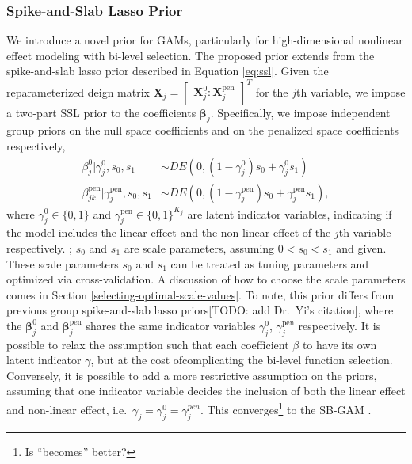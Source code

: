 \documentclass[AMA,STIX1COL,]{WileyNJD-v2}
\begin{document}
\hypertarget{spike-and-slab-lasso-prior}{%
\subsubsection{Spike-and-Slab Lasso
Prior}\label{spike-and-slab-lasso-prior}}

We introduce a novel prior for GAMs, particularly for high-dimensional
nonlinear effect modeling with bi-level selection. The proposed prior
extends from the spike-and-slab lasso prior described in Equation
\ref{eq:ssl}. Given the reparameterized deign matrix
\(\boldsymbol{X}_j = \begin{bmatrix} \boldsymbol{X}_j^0 : \boldsymbol{X}_j^\text{pen}\end{bmatrix}^T\)
for the \(j\)th variable, we impose a two-part SSL prior to the
coefficients \(\boldsymbol{\beta}_j\). Specifically, we impose
independent group priors on the null space coefficients and on the
penalized space coefficients respectively, \[
\begin{aligned}
  \beta^0_{j} |\gamma^0_{j},s_0,s_1 &\sim DE(0,(1-\gamma^0_{j}) s_0 + \gamma^0_{j} s_1)\\
  \beta^\text{pen}_{jk} | \gamma^\text{pen}_{j},s_0,s_1 &\sim DE(0,(1-\gamma^\text{pen}_{j}) s_0 + \gamma^\text{pen}_{j} s_1), 
\end{aligned}
\] where \(\gamma^0_{j}\in\{0,1\}\) and
\(\gamma^\text{pen}_{j}\in \{0,1\}^{K_j}\) are latent indicator
variables, indicating if the model includes the linear effect and the
non-linear effect of the \(j\)th variable respectively. ; \(s_0\) and
\(s_1\) are scale parameters, assuming \(0 < s_0 < s_1\) and given.
These scale parameters \(s_0\) and \(s_1\) can be treated as tuning
parameters and optimized via cross-validation. A discussion of how to
choose the scale parameters comes in Section
\ref{selecting-optimal-scale-values}. To note, this prior differs from
previous group spike-and-slab lasso priors{[}TODO: add Dr.~Yi's
citation{]}, where the \(\boldsymbol{\beta}^0_j\) and
\(\boldsymbol{\beta}^\text{pen}_j\) shares the same indicator variables
\(\gamma_j^0\), \(\gamma_j^\text{pen}\) respectively. It is possible to
relax the assumption such that each coefficient \(\beta\) to have its
own latent indicator \(\gamma\), but at the cost ofcomplicating the
bi-level function selection. Conversely, it is possible to add a more
restrictive assumption on the priors, assuming that one indicator
variable decides the inclusion of both the linear effect and non-linear
effect, i.e.~\(\gamma_j = \gamma^0_j = \gamma^{pen}_j\). This
converges\footnote{Is ``becomes'' better?} to the SB-GAM
\citep{Bai2021}.
\end{document}
